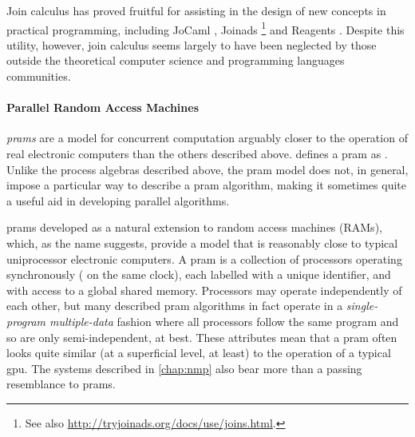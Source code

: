 Join calculus has proved fruitful for assisting in the design of new concepts in practical programming, including JoCaml \cite{Fournet2003}, Joinads \cite{Petricek2011}\footnote{See also \url{http://tryjoinads.org/docs/use/joins.html}.} and Reagents \cite{Turon2012}.  Despite this utility, however, join calculus seems largely to have been neglected by those outside the theoretical computer science and programming languages communities.

\paragraph{\label{sec:back:pram}Parallel Random Access Machines}

\emph{\Glspl{pram}} are a model for concurrent computation arguably closer to the operation of real electronic computers than the others described above.  \citeauthor{JaJa2011} defines a \gls{pram} as .  Unlike the process algebras described above, the \gls{pram} model does not, in general, impose a particular way to describe a \gls{pram} algorithm, making it sometimes quite a useful aid in developing parallel algorithms.

\Glspl{pram} developed as a natural extension to random access machines (RAMs), which, as the name suggests, provide a model that is reasonably close to typical uniprocessor electronic computers.  A \gls{pram} is a collection of processors operating synchronously (\ie{} on the same clock), each labelled with a unique identifier, and with access to a global shared memory.  Processors may operate independently of each other, but many described \gls{pram} algorithms in fact operate in a \emph{single-program multiple-data} fashion where all processors follow the same program and so are only semi-independent, at best.  These attributes mean that a \gls{pram} often looks quite similar (at a superficial level, at least) to the operation of a typical \gls{gpu}.  The systems described in \cref{chap:nmp} also bear more than a passing resemblance to \glspl{pram}.